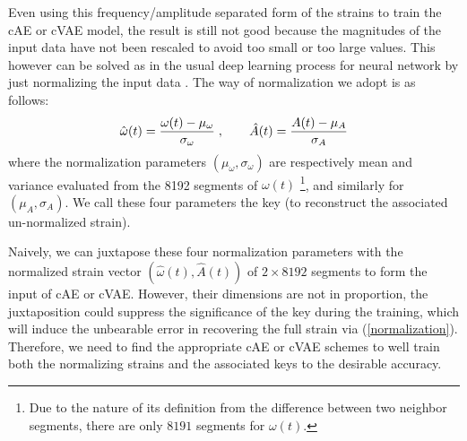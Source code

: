 \documentclass[twocolumn,prd,superscriptaddress,nofootinbib]{revtex4-1}
\def \be {\begin{equation}}
\def \ee {\end{equation}}
\newcommand{\eq}[1]{(\ref{#1})}
\begin{document}



Even using this frequency/amplitude separated form of the strains to train the cAE or cVAE model, the result is still not good because the magnitudes of the input data have not been rescaled to avoid too small or too large values. This however can be solved as in the usual deep learning process for neural network by just normalizing the input data \cite{franoischollet2017learning}. The way of normalization we adopt is as follows:
\be
\hat{\omega}(t)={\omega(t)-\mu_{\omega} \over \sigma_{\omega}}\;, \qquad \hat{A}(t)={A(t)-\mu_A \over \sigma_A} \label{normalization}
\ee
where the normalization parameters $(\mu_{\omega},\sigma_{\omega})$ are respectively mean and variance evaluated from the 8192 segments of $\omega(t)$ \footnote{Due to the nature of its definition from the difference between two neighbor segments, there are only $8191$ segments for $\omega(t)$.}, and similarly for $(\mu_A,\sigma_A)$. We call these four parameters the key (to reconstruct the associated un-normalized strain). 


Naively, we can juxtapose these four normalization parameters with the normalized strain vector $(\hat{\omega}(t), \hat{A}(t))$ of $2\times 8192$ segments to form the input of cAE or cVAE. However, their dimensions are not in proportion, the juxtaposition could suppress the significance of the key during the training, which will induce the unbearable error in recovering the full strain via \eq{normalization}. Therefore, we need to find the appropriate cAE or cVAE schemes to well train both the normalizing strains and the associated keys to the desirable accuracy. 
\end{document}
